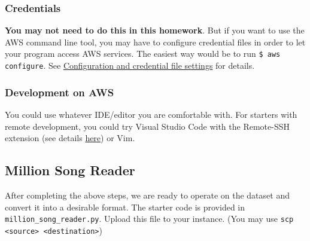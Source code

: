 \subsubsection{Credentials}
\textbf{You may not need to do this in this homework}. But if you want to use the AWS command line tool, you may have to configure credential files in order to let your program access AWS services. The easiest way would be to run \texttt{\$ aws configure}. See \href{https://docs.aws.amazon.com/cli/latest/userguide/cli-configure-files.html}{Configuration and credential file settings} for details.

\subsubsection{Development on AWS}
You could use whatever IDE/editor you are comfortable with. For starters with remote development, you could try Visual Studio Code with the Remote-SSH extension (see details \href{https://code.visualstudio.com/docs/remote/ssh}{here}) or Vim.

\clearpage

\subsection{Million Song Reader}
After completing the above steps, we are ready to operate on the dataset and convert it into a desirable format. The starter code is provided in \texttt{million\_song\_reader.py}. Upload this file to your instance. (You may use \texttt{scp <source> <destination>})

